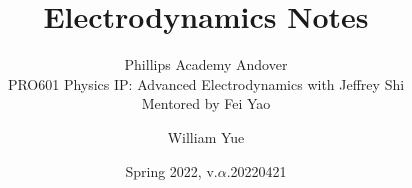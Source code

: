\documentclass[11pt, oneside]{scrbook}
\begin{document}
\title{Electrodynamics Notes}
\subtitle{Phillips Academy Andover\\
PRO601 Physics IP: Advanced Electrodynamics with Jeffrey Shi\\
Mentored by Fei Yao}
\author{William Yue}
\date{Spring 2022, v.$\alpha$.20220421}
\maketitle



\tableofcontents





\end{document}
